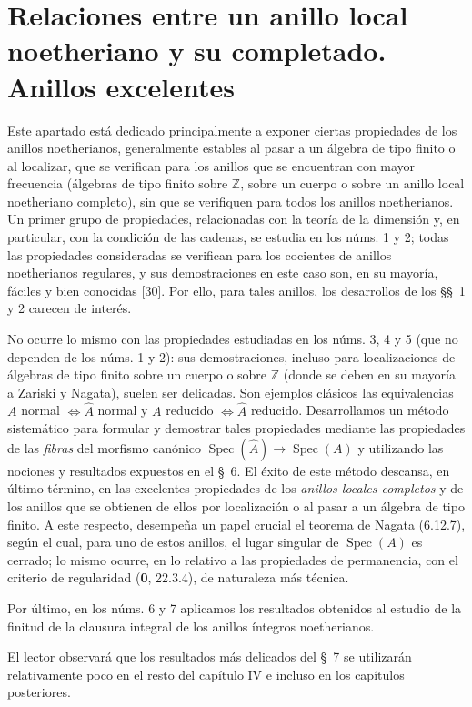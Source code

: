 \section{Relaciones entre un anillo local noetheriano y su completado. Anillos excelentes}
\label{section:IV.7-fr}

Este apartado está dedicado principalmente a exponer ciertas
propiedades de los anillos noetherianos, generalmente estables
al pasar a un álgebra de tipo finito o al localizar, que se
verifican para los anillos que se encuentran con mayor
frecuencia (álgebras de tipo finito sobre $\mathbb Z$, sobre
un cuerpo o sobre un anillo local noetheriano completo), sin
que se verifiquen para todos los anillos noetherianos. Un
primer grupo de propiedades, relacionadas con la teoría de
la dimensión y, en particular, con la condición de las
cadenas, se estudia en los núms. 1 y 2; todas las propiedades
consideradas se verifican para los cocientes de anillos
noetherianos regulares, y sus demostraciones en este caso
son, en su mayoría, fáciles y bien conocidas [30]. Por ello,
para tales anillos, los desarrollos de los \S\S~1 y 2 carecen
de interés.

No ocurre lo mismo con las propiedades estudiadas en los
núms. 3, 4 y 5 (que no dependen de los núms. 1 y 2): sus
demostraciones, incluso para localizaciones de álgebras de
tipo finito sobre un cuerpo o sobre $\mathbb Z$ (donde se
deben en su mayoría a Zariski y Nagata), suelen ser
delicadas. Son ejemplos clásicos las equivalencias
$A$ normal $\Longleftrightarrow \widehat A$ normal y
$A$ reducido $\Longleftrightarrow \widehat A$ reducido.
Desarrollamos un método sistemático para formular y
demostrar tales propiedades mediante las propiedades de
las \emph{fibras} del morfismo canónico
$\operatorname{Spec}(\widehat A)\to\operatorname{Spec}(A)$
y utilizando las nociones y resultados expuestos en el \S~6.
El éxito de este método descansa, en último término, en
las excelentes propiedades de los \emph{anillos locales
completos} y de los anillos que se obtienen de ellos por
localización o al pasar a un álgebra de tipo finito. A este
respecto, desempeña un papel crucial el teorema de Nagata
(6.12.7), según el cual, para uno de estos anillos, el lugar
singular de $\operatorname{Spec}(A)$ es cerrado; lo mismo
ocurre, en lo relativo a las propiedades de permanencia,
con el criterio de regularidad (\textbf 0, 22.3.4), de naturaleza
más técnica.

Por último, en los núms. 6 y 7 aplicamos los resultados
obtenidos al estudio de la finitud de la clausura integral
de los anillos íntegros noetherianos.

El lector observará que los resultados más delicados del
\S~7 se utilizarán relativamente poco en el resto del
capítulo IV e incluso en los capítulos posteriores.
